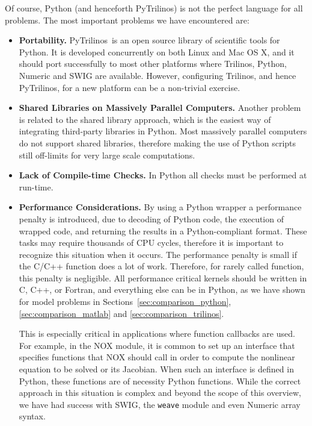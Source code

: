 \documentclass[acmtocl]{acmtrans2m}
\newcommand{\PyTrilinos}{{PyTrilinos}}
\begin{document}
\smallskip

Of course, Python (and henceforth PyTrilinos) is not the
perfect language for all problems. The most important problems we have
encountered are:

\begin{itemize}

\item {\bf Portability.} \PyTrilinos\ is an open source library of
  scientific tools for Python.  It is developed concurrently on both
  Linux and Mac OS X, and it should port successfully to most other
  platforms where Trilinos, Python, Numeric and SWIG are
  available. However, configuring Trilinos, and hence \PyTrilinos, for
  a new platform can be a non-trivial exercise.

\item {\bf Shared Libraries on Massively Parallel Computers.} Another
  problem is related to the shared library approach, which is the
  easiest way of integrating third-party libraries in Python. Most
  massively parallel computers do not support shared libraries,
  therefore making the use of Python scripts still off-limits for very
  large scale computations.

\item {\bf Lack of Compile-time Checks.} In Python all checks must be
  performed at run-time.

\item {\bf Performance Considerations.}  By using a Python wrapper a
  performance penalty is introduced, due to decoding of Python code,
  the execution of wrapped code, and returning the results in a
  Python-compliant format. These tasks may require thousands of CPU
  cycles, therefore it is important to recognize this situation when
  it occurs.  The performance penalty is small if the C/C++ function
  does a lot of work.  Therefore, for rarely called function, this
  penalty is negligible.  All performance critical kernels should be
  written in C, C++, or Fortran, and everything else can be in Python, as we
  have shown for model problems in Sections~\ref{sec:comparison_python},
  \ref{sec:comparison_matlab} and \ref{sec:comparison_trilinos}.

  This is especially critical in applications where function callbacks
  are used.  For example, in the NOX module, it is common to set up an
  interface that specifies functions that NOX should call in order to
  compute the nonlinear equation to be solved or its Jacobian.  When
  such an interface is defined in Python, these functions are of
  necessity Python functions.  While the correct approach in this
  situation is complex and beyond the scope of this overview, we have
  had success with SWIG, the {\tt weave} module and even Numeric array
  syntax.


\end{itemize}
\end{document}
